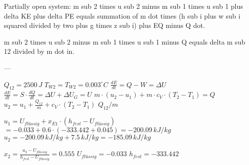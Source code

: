 Partially open system:  
m sub 2 times u sub 2 minus m sub 1 times u sub 1 plus delta KE plus delta PE equals summation of m dot times (h sub i plus w sub i squared divided by two plus g times z sub i) plus EQ minus Q dot.  

m sub 2 times u sub 2 minus m sub 1 times u sub 1 minus Q equals delta m sub 12 divided by m dot in.  

---

\( Q_{12} = 2500 \, J \)  
\( T_{W2} = T_{W2} = 0.003^\circ C \)  
\( \frac{dE}{dt} = Q - W = \Delta U \)  
\( \frac{dE}{dt} = S \cdot \frac{dQ}{dt} = \Delta U + \Delta U_G = U \)  
\( m \cdot (u_2 - u_1) + m \cdot c_V \cdot (T_2 - T_1) = Q \)  
\( u_2 = u_1 + \frac{Q_{12}}{m} + c_V \cdot (T_2 - T_1) \)  
\( Q_{12} / m \)  

\( u_1 = U_{flüssig} + x_{E1} \cdot (h_{fest} - U_{flüssig}) \)  
\( = -0.033 + 0.6 \cdot (-333.442 + 0.045) = -200.09 \, kJ/kg \)  
\( u_2 = -200.09 \, kJ/kg + 7.5 \, kJ/kg = -185.09 \, kJ/kg \)  

\( x_2 = \frac{u_2 - U_{flüssig}}{h_{fest} - U_{flüssig}} = 0.555 \)  
\( U_{flüssig} = -0.033 \)  
\( h_{fest} = -333.442 \)